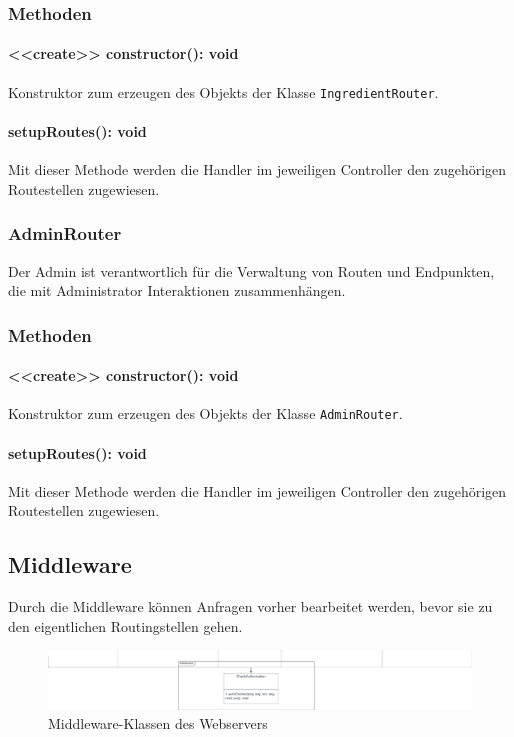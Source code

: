 \documentclass[parskip=full]{scrartcl}
\begin{document}
\subsubsection*{Methoden}
\paragraph{<<create>> constructor(): void}Konstruktor zum erzeugen des Objekts der Klasse \texttt{IngredientRouter}.
\paragraph{setupRoutes(): void}Mit dieser Methode werden die Handler im jeweiligen Controller den zugehörigen Routestellen zugewiesen.

\subsubsection{AdminRouter}
Der Admin ist verantwortlich für die Verwaltung von Routen und Endpunkten, die mit Administrator Interaktionen zusammenhängen.
\subsubsection*{Methoden}
\paragraph{<<create>> constructor(): void}Konstruktor zum erzeugen des Objekts der Klasse \texttt{AdminRouter}.
\paragraph{setupRoutes(): void}Mit dieser Methode werden die Handler im jeweiligen Controller den zugehörigen Routestellen zugewiesen.

\subsection{Middleware}
Durch die Middleware können Anfragen vorher bearbeitet werden, bevor sie zu den eigentlichen Routingstellen gehen.

\begin{figure}[htp]
    \centering
    \includegraphics[width = 1\textwidth]{images/webserver/middleware.pdf}
    \caption{Middleware-Klassen des Webservers}
    \label{fig:middleware}
\end{figure}
\end{document}
